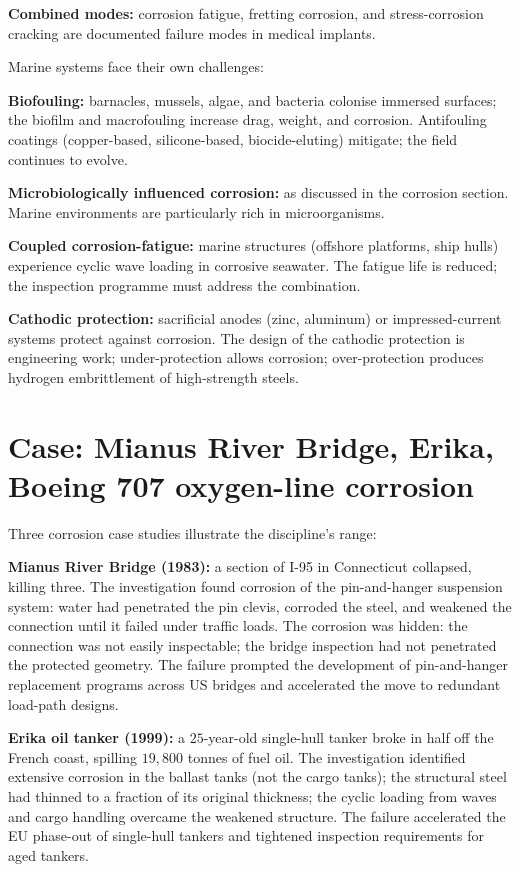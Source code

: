 \textbf{Combined modes:} corrosion fatigue, fretting corrosion, and stress-corrosion cracking are documented failure modes in medical implants.

Marine systems face their own challenges:

\textbf{Biofouling:} barnacles, mussels, algae, and bacteria colonise immersed surfaces; the biofilm and macrofouling increase drag, weight, and corrosion. Antifouling coatings (copper-based, silicone-based, biocide-eluting) mitigate; the field continues to evolve.

\textbf{Microbiologically influenced corrosion:} as discussed in the corrosion section. Marine environments are particularly rich in microorganisms.

\textbf{Coupled corrosion-fatigue:} marine structures (offshore platforms, ship hulls) experience cyclic wave loading in corrosive seawater. The fatigue life is reduced; the inspection programme must address the combination.

\textbf{Cathodic protection:} sacrificial anodes (zinc, aluminum) or impressed-current systems protect against corrosion. The design of the cathodic protection is engineering work; under-protection allows corrosion; over-protection produces hydrogen embrittlement of high-strength steels.

\section{Case: Mianus River Bridge, Erika, Boeing 707 oxygen-line corrosion}

Three corrosion case studies illustrate the discipline's range:

\textbf{Mianus River Bridge (1983):} a section of I-95 in Connecticut collapsed, killing three. The investigation found corrosion of the pin-and-hanger suspension system: water had penetrated the pin clevis, corroded the steel, and weakened the connection until it failed under traffic loads. The corrosion was hidden: the connection was not easily inspectable; the bridge inspection had not penetrated the protected geometry. The failure prompted the development of pin-and-hanger replacement programs across US bridges and accelerated the move to redundant load-path designs.

\textbf{Erika oil tanker (1999):} a $25$-year-old single-hull tanker broke in half off the French coast, spilling $19{,}800$ tonnes of fuel oil. The investigation identified extensive corrosion in the ballast tanks (not the cargo tanks); the structural steel had thinned to a fraction of its original thickness; the cyclic loading from waves and cargo handling overcame the weakened structure. The failure accelerated the EU phase-out of single-hull tankers and tightened inspection requirements for aged tankers.

